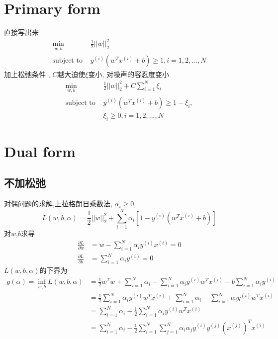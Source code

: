 \documentclass[12pt,letterpaper]{article}
\begin{document}
\section{Primary form}
直接写出来
\[
    \begin{split} 
    \min_{w,b}\quad  & \frac{1}{2}{||w||_2^2} \\
    \text{subject to } &  y^{(i)}(w^Tx^{(i)}+b) \geq 1 , i = 1,2,...,N 
    \end{split} 
\]
加上松弛条件 , $C$越大迫使$\xi$变小, 对噪声的容忍度变小
\[
    \begin{split} 
    \min_{w,b}\quad  & \frac{1}{2}{||w||_2^2} + C\sum_{i=1}^{N} \xi_i \\
    \text{subject to } &  y^{(i)}(w^Tx^{(i)}+b) \geq 1 - \xi_i, \\
    & \xi_i \geq 0 ,  i = 1,2,...,N
    \end{split} 
\]

\section{Dual form}
\subsection{不加松弛}
对偶问题的求解,上拉格朗日乘数法, $\alpha_i \geq 0$,
\[
	L(w,b,\alpha) = \frac{1}{2}||w||_2^2 + \sum_{i=1}^N\alpha_i[1 - y^{(i)}(w^Tx^{(i)}+b)  ]
\]
 对$w$,$b$求导
 \[
	  \begin{split} 
	 \frac{\partial L}{\partial w} &= w - \sum_{i=1}^{N} \alpha_i y^{(i)}x^{(i)} = 0 \\
	 \frac{\partial L}{\partial b} &= \sum_{i=1}^{N} \alpha_iy^{(i)} = 0
	 \end{split}
 \]
$L(w,b,\alpha)$的下界为
\[ \begin{split} 
	g(\alpha) = \inf_{w,b}L(w,b,\alpha) &= \frac{1}{2} w^Tw + \sum_{i=1}^{N}\alpha_i - \sum_{i=1}^{N} \alpha_iy^{(i)}w^Tx^{(i)} - b\sum_{i=1}^{N} \alpha_iy^{(i)} \\
	&= \frac{1}{2} \sum_{i=1}^{N} \alpha_i y^{(i)} w^T x^{(i)} + \sum_{i=1}^{N}\alpha_i - \sum_{i=1}^{N} \alpha_iy^{(i)}w^Tx^{(i)} \\
	&= \sum_{i=1}^{N}\alpha_i - \frac{1}{2} \sum_{i=1}^{N} \alpha_iy^{(i)}w^Tx^{(i)} \\
	&= \sum_{i=1}^{N}\alpha_i - \frac{1}{2} \sum_{i=1}^{N}  \sum_{j=1}^N
	\alpha_i\alpha_j y^{(i)}y^{(j)} (x^{(j)})^Tx^{(i)}\\
	\end{split} 
\]
\end{document}
